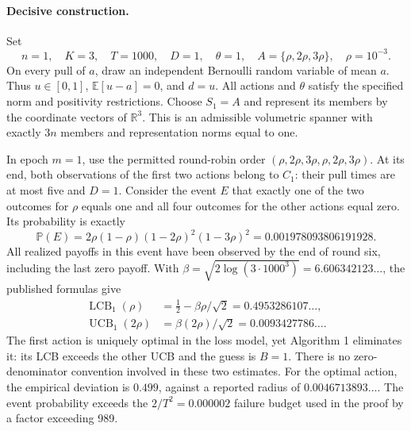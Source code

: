 \documentclass[10pt]{article}
\begin{document}
\paragraph*{Decisive construction.}\mbox{}\par
Set \[n=1,\quad K=3,\quad T=1000,\quad D=1,\quad
\theta=1,\quad A=\{\rho,2\rho,3\rho\},\quad \rho=10^{-3}.\] On every pull of \(a\), draw an independent Bernoulli random variable of mean \(a\). Thus \(u\in[0,1]\), \(\mathbb E[u-a]=0\), and \(d=u\). All actions and \(\theta\) satisfy the specified norm and positivity restrictions. Choose \(S_1=A\) and represent its members by the coordinate vectors of \(\mathbb R^3\). This is an admissible volumetric spanner with exactly \(3n\) members and representation norms equal to one.\par
In epoch \(m=1\), use the permitted round-robin order \((\rho,2\rho,3\rho,\rho,2\rho,3\rho)\). At its end, both observations of the first two actions belong to \(C_1\): their pull times are at most five and \(D=1\). Consider the event \(E\) that exactly one of the two outcomes for \(\rho\) equals one and all four outcomes for the other actions equal zero. Its probability is exactly \[\mathbb P(E)=2\rho(1-\rho)(1-2\rho)^2(1-3\rho)^2
=0.001978093806191928.\] All realized payoffs in this event have been observed by the end of round six, including the last zero payoff. With \(\beta=\sqrt{2\log(3\cdot1000^3)}=6.606342123\ldots\), the published formulas give \[\begin{aligned}
\operatorname{LCB}_1(\rho)
&=\tfrac12-\beta\rho/\sqrt2
=0.4953286107\ldots,\\
\operatorname{UCB}_1(2\rho)
&=\beta(2\rho)/\sqrt2
=0.0093427786\ldots .\end{aligned}\] The first action is uniquely optimal in the loss model, yet Algorithm 1 eliminates it: its LCB exceeds the other UCB and the guess is \(B=1\). There is no zero-denominator convention involved in these two estimates. For the optimal action, the empirical deviation is \(0.499\), against a reported radius of \(0.0046713893\ldots\). The event probability exceeds the \(2/T^2=0.000002\) failure budget used in the proof by a factor exceeding 989.\par
\end{document}

